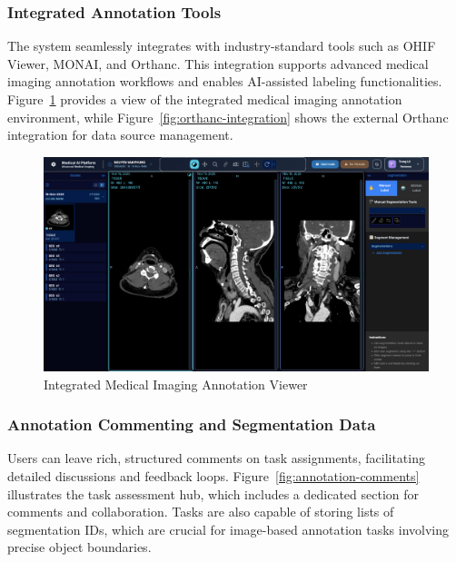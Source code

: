 \subsubsection{Integrated Annotation Tools}
The system seamlessly integrates with industry-standard tools such as OHIF Viewer, MONAI, and Orthanc. This integration supports advanced medical imaging annotation workflows and enables AI-assisted labeling functionalities. Figure~\ref{fig:annotation-viewer} provides a view of the integrated medical imaging annotation environment, while Figure~\ref{fig:orthanc-integration} shows the external Orthanc integration for data source management.

\begin{figure}[h!]
    \centering
    \includegraphics[width=1\textwidth]{content/resources/features/ohif.png}
    \caption{Integrated Medical Imaging Annotation Viewer}
    \label{fig:annotation-viewer}
\end{figure}

\subsubsection{Annotation Commenting and Segmentation Data}
Users can leave rich, structured comments on task assignments, facilitating detailed discussions and feedback loops. Figure~\ref{fig:annotation-comments} illustrates the task assessment hub, which includes a dedicated section for comments and collaboration. Tasks are also capable of storing lists of segmentation IDs, which are crucial for image-based annotation tasks involving precise object boundaries.

